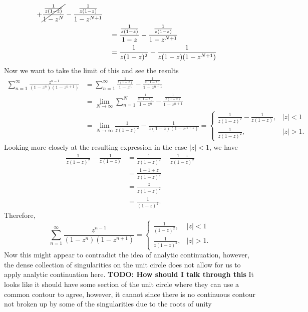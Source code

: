 \documentclass[10pt]{amsart}
\theoremstyle{nonumberplain}
\begin{document}
\begin{enumerate}[label={\bf {\arabic*}:}]
\begin{align*}
		+ \cancel{\frac {\frac 1 {z (1 - z)}}{1 - z^N}} - \frac{\frac 1 {z (1 - z)}}{1 - z^{N + 1}} \\
	& \quad = \frac {\frac 1 {z (1 - z)}}{1 - z} - \frac{\frac 1 {z (1 - z)}}{1 - z^{N + 1}} \\
	& \quad = \frac {1}{z (1 - z)^2} - \frac1{z (1 - z)(1 - z^{N + 1})}
\end{align*}
Now we want to take the limit of this and see the results
\begin{align*}
\sum_{n=1}^{\infty} \frac{z^{n-1}}{\left(1-z^n\right)\left(1-z^{n+1}\right)}
	&= \sum_{n=1}^{\infty} \frac {\frac 1 {z (1 - z)}}{1 - z^n} - \frac{\frac 1 {z (1 - z)}}{1 - z^{n + 1}} \\
	&= \lim_{N\rightarrow \infty} \sum_{n=1}^{N} \frac {\frac 1 {z (1 - z)}}{1 - z^n} - \frac{\frac 1 {z (1 - z)}}{1 - z^{n + 1}} \\
	&= \lim_{N\rightarrow \infty} \frac {1}{z (1 - z)^2} - \frac1{z (1 - z)(1 - z^{N + 1})}
		= \begin{cases} \frac {1}{z (1 - z)^2} - \frac1{z (1 - z)}, & |z|<1 \\ \frac{1}{z(1-z)^2}, & |z|>1 .\end{cases}
\end{align*}
Looking more closely at the resulting expression in the case $|z| < 1$, we have
\begin{align*}
\frac {1}{z (1 - z)^2} - \frac1{z (1 - z)} &= \frac {1}{z (1 - z)^2} - \frac{1 - z}{z (1 - z)^2} \\
	&= \frac {1 - 1 + z}{z (1 - z)^2} \\
	&= \frac {z}{z (1 - z)^2} \\
	&= \frac 1 {(1 - z)^2}.
\end{align*}
Therefore,
$$
\sum_{n=1}^{\infty} \frac{z^{n-1}}{\left(1-z^n\right)\left(1-z^{n+1}\right)}= \begin{cases}\frac{1}{(1-z)^2}, & |z|<1 \\ \frac{1}{z(1-z)^2}, & |z|>1 .\end{cases}
$$
Now this might appear to contradict the idea of analytic continuation, however, the dense collection of singularities on the unit circle does not allow for us to apply analytic continuation here.
\textbf{TODO: How should I talk through this} It looks like it should have some section of the unit circle where they can use a common contour to agree, however, it cannot since there is no continuous contour not broken up by some of the singularities due to the roots of unity

\newpage


\end{enumerate}
\end{document}
